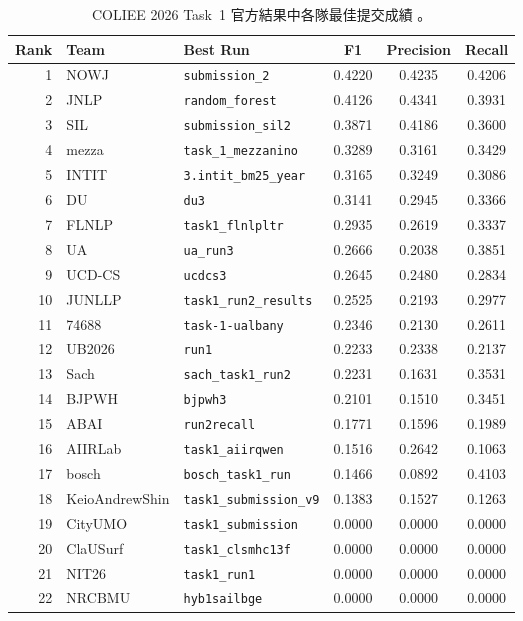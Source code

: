 \begin{table}[t]
  \centering
  \scriptsize
  \begin{tabular}{rllccc}
    \toprule
    Rank & Team & Best Run & F1 & Precision & Recall \\
    \midrule
    1 & NOWJ & \texttt{submission\_2} & 0.4220 & 0.4235 & 0.4206 \\
    2 & JNLP & \texttt{random\_forest} & 0.4126 & 0.4341 & 0.3931 \\
    3 & SIL & \texttt{submission\_sil2} & 0.3871 & 0.4186 & 0.3600 \\
    4 & mezza & \texttt{task\_1\_mezzanino} & 0.3289 & 0.3161 & 0.3429 \\
    5 & INTIT & \texttt{3.intit\_bm25\_year} & 0.3165 & 0.3249 & 0.3086 \\
    6 & DU & \texttt{du3} & 0.3141 & 0.2945 & 0.3366 \\
    7 & FLNLP & \texttt{task1\_flnlpltr} & 0.2935 & 0.2619 & 0.3337 \\
    8 & UA & \texttt{ua\_run3} & 0.2666 & 0.2038 & 0.3851 \\
    9 & UCD-CS & \texttt{ucdcs3} & 0.2645 & 0.2480 & 0.2834 \\
    10 & JUNLLP & \texttt{task1\_run2\_results} & 0.2525 & 0.2193 & 0.2977 \\
    11 & 74688 & \texttt{task-1-ualbany} & 0.2346 & 0.2130 & 0.2611 \\
    12 & UB2026 & \texttt{run1} & 0.2233 & 0.2338 & 0.2137 \\
    13 & Sach & \texttt{sach\_task1\_run2} & 0.2231 & 0.1631 & 0.3531 \\
    14 & BJPWH & \texttt{bjpwh3} & 0.2101 & 0.1510 & 0.3451 \\
    15 & ABAI & \texttt{run2recall} & 0.1771 & 0.1596 & 0.1989 \\
    16 & AIIRLab & \texttt{task1\_aiirqwen} & 0.1516 & 0.2642 & 0.1063 \\
    17 & bosch & \texttt{bosch\_task1\_run} & 0.1466 & 0.0892 & 0.4103 \\
    18 & KeioAndrewShin & \texttt{task1\_submission\_v9} & 0.1383 & 0.1527 & 0.1263 \\
    19 & CityUMO & \texttt{task1\_submission} & 0.0000 & 0.0000 & 0.0000 \\
    20 & ClaUSurf & \texttt{task1\_clsmhc13f} & 0.0000 & 0.0000 & 0.0000 \\
    21 & NIT26 & \texttt{task1\_run1} & 0.0000 & 0.0000 & 0.0000 \\
    22 & NRCBMU & \texttt{hyb1sailbge} & 0.0000 & 0.0000 & 0.0000 \\
    \bottomrule
  \end{tabular}
  \caption{COLIEE 2026 Task~1 官方結果中各隊最佳提交成績 \cite{coliee2026task1results}。}
  \label{tab:official-ranking}
\end{table}

